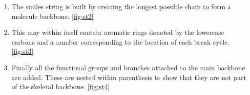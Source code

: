 \begin{enumerate}
    \item The smiles string is built by creating the longest possible chain to form a molecule backbone.
    \autoref{fig:st2}

    \item This may within itself contain aromatic rings denoted by the lowercase carbons and a number corresponding to the location of each break cycle. \autoref{fig:st3}

    \item Finally all the functional groups and branches attached to the main backbone are added. These are nested within parenthesis to show that they are not part of the skeletal backbone. \autoref{fig:st4}
\end{enumerate}



